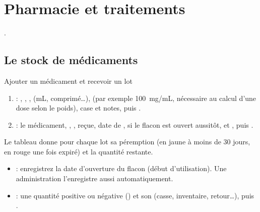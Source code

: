 \documentclass[11pt,a4paper]{article}
\begin{document}
\section{Pharmacie et traitements}\label{sec:pharmacie}
.

\subsection{Le stock de médicaments}
\begin{procedure}{Ajouter un médicament et recevoir un lot}
\begin{enumerate}
  \item {} : , ,
    ,  (mL, comprimé…),
     (par exemple 100~mg/mL, nécessaire au calcul d'une
    dose selon le poids), case  et notes, puis .
  \item {} : le médicament, ,
    ,  reçue, date de ,
     si le flacon est ouvert aussitôt,
     et , puis .
\end{enumerate}
\end{procedure}

Le tableau  donne pour chaque lot sa péremption (en jaune
à moins de 30 jours, en rouge une fois expiré) et la quantité restante.
\begin{itemize}
  \item {} : enregistrez la date d'ouverture du flacon (début
    d'utilisation). Une administration l'enregistre aussi automatiquement.
  \item {} : une quantité positive ou négative (\btn{+ / -}) et
    son  (casse, inventaire, retour…), puis .
\end{itemize}
\end{document}
